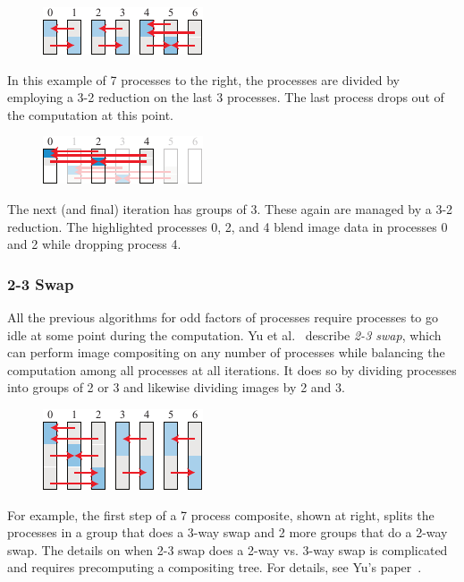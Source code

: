 \documentclass{vgtc}                          %
\newcommand*{\lcite}[1]{~\cite{#1}}
\newcommand*{\scite}[1]{~\cite{#1}}
\newcommand{\etal}{et al.\xspace}
\newcommand*{\keyterm}[1]{\emph{#1}}
\newcommand*{\textalgorithm}[1]{\textsf{#1}\xspace}
\newcommand{\ttswap}{\textalgorithm{2-3 swap}}
\begin{document}
\begin{figure}
  \includegraphics[scale=.75]{remainder-1}
\end{figure}
In this example of 7 processes to the right, the processes are divided by employing a 3-2 reduction on the last 3 processes.
The last process drops out of the computation at this point.

\begin{figure}
  \includegraphics[scale=.75]{remainder-2}
\end{figure}
The next (and final) iteration has groups of 3.
These again are managed by a 3-2 reduction.
The highlighted processes 0, 2, and 4 blend image data in processes 0 and 2 while dropping process 4.

\subsubsection{2-3 Swap}

All the previous algorithms for odd factors of processes require processes to go idle at some point during the computation.
Yu \etal\scite{23Swap} describe \keyterm{\ttswap}, which can perform image compositing on any number of processes while balancing the computation among all processes at all iterations.
It does so by dividing processes into groups of 2 or 3 and likewise dividing images by 2 and 3.

\begin{figure}
  \includegraphics[scale=.75]{2-3-swap-1}
\end{figure}
For example, the first step of a 7 process composite, shown at right, splits the processes in a group that does a 3-way swap and 2 more groups that do a 2-way swap.
The details on when \ttswap does a 2-way vs. 3-way swap is complicated and requires precomputing a compositing tree.
For details, see Yu's paper\lcite{23Swap}.
\end{document}
